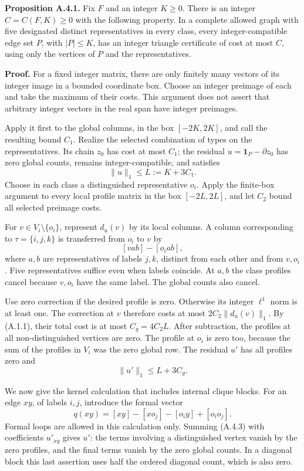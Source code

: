 \documentclass[english,11pt,a4paper]{article}
\begin{document}
\textbf{Proposition A.4.1.} Fix \(F\) and an integer \(K\ge0\). There is an integer \(C=C(F,K)\ge0\) with the following property. In a complete allowed graph with five designated distinct representatives in every class, every integer-compatible edge set \(P\), with \(|P|\le K\), has an integer triangle certificate of cost at most \(C\), using only the vertices of \(P\) and the representatives.

\textbf{Proof.} For a fixed integer matrix, there are only finitely many vectors of its integer image in a bounded coordinate box. Choose an integer preimage of each and take the maximum of their costs. This argument does not assert that arbitrary integer vectors in the real span have integer preimages.

Apply it first to the global columns, in the box \([-2K,2K]\), and call the resulting bound \(C_1\). Realize the selected combination of types on the representatives. Its chain \(z_0\) has cost at most \(C_1\); the residual \(u=\mathbf1_P-\partial z_0\) has zero global counts, remains integer-compatible, and satisfies \[\|u\|_1\le L:=K+3C_1.\] Choose in each class a distinguished representative \(o_i\). Apply the finite-box argument to every local profile matrix in the box \([-2L,2L]\), and let \(C_2\) bound all selected preimage costs.

For \(v\in V_i\setminus\{o_i\}\), represent \(d_u(v)\) by its local columns. A column corresponding to \(\tau=\{i,j,k\}\) is transferred from \(o_i\) to \(v\) by \[[vab]-[o_iab],
\tag{A.4.1}\] where \(a,b\) are representatives of labels \(j,k\), distinct from each other and from \(v,o_i\). Five representatives suffice even when labels coincide. At \(a,b\) the class profiles cancel because \(v,o_i\) have the same label. The global counts also cancel.

Use zero correction if the desired profile is zero. Otherwise its integer \(\ell^1\) norm is at least one. The correction at \(v\) therefore costs at most \(2C_2\|d_u(v)\|_1\). By (A.1.1), their total cost is at most \(C_g=4C_2L\). After subtraction, the profiles at all non-distinguished vertices are zero. The profile at \(o_i\) is zero too, because the sum of the profiles in \(V_i\) was the zero global row. The residual \(u'\) has all profiles zero and \[\|u'\|_1\le L+3C_g.
\tag{A.4.2}\]

We now give the kernel calculation that includes internal clique blocks. For an edge \(xy\), of labels \(i,j\), introduce the formal vector \[q(xy)=[xy]-[x o_j]-[o_i y]+[o_i o_j].
\tag{A.4.3}\] Formal loops are allowed in this calculation only. Summing (A.4.3) with coefficients \(u'_{xy}\) gives \(u'\): the terms involving a distinguished vertex vanish by the zero profiles, and the final terms vanish by the zero global counts. In a diagonal block this last assertion uses half the ordered diagonal count, which is also zero.
\end{document}
